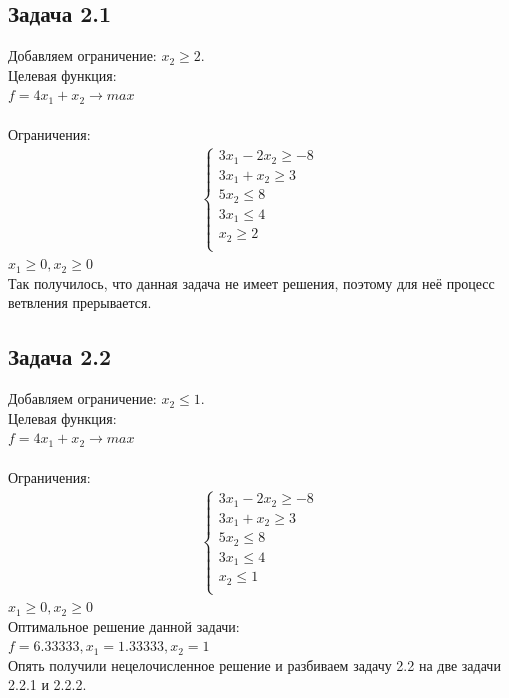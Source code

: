 \documentclass[14pt,a4paper,fleqn]{extarticle}
\begin{document}
	\subsection*{Задача 2.1}
	Добавляем ограничение: $x_2 \geq 2$.\\
	
	Целевая функция:\\
	$f = 4x_1+x_2 \longrightarrow max$\\\\
	Ограничения:
	\begin{align*}
		\begin{cases}
			3x_1 - 2x_2 \geq -8\\
			3x_1 + x_2 \geq 3\\
			5 x_2 \leq 8\\
			3 x_1 \leq 4\\
			x_2 \geq 2\\
		\end{cases}
	\end{align*}
	$x_1 \geq 0, x_2 \geq 0$\\
	
	Так получилось, что данная задача не имеет решения, поэтому для неё процесс ветвления прерывается.\\
	
	\newpage
	\subsection*{Задача 2.2}
	Добавляем ограничение: $x_2 \leq 1$.\\
	
	Целевая функция:\\
	$f = 4x_1+x_2 \longrightarrow max$\\\\
	Ограничения:
	\begin{align*}
		\begin{cases}
			3x_1 - 2x_2 \geq -8\\
			3x_1 + x_2 \geq 3\\
			5 x_2 \leq 8\\
			3 x_1 \leq 4\\
			x_2 \leq 1\\
		\end{cases}
	\end{align*}
	$x_1 \geq 0, x_2 \geq 0$\\
	
	Оптимальное решение данной задачи:\\
	$f = 6.33333, x_1 = 1.33333, x_2 = 1$\\
	Опять получили нецелочисленное решение и разбиваем задачу 2.2 на две задачи 2.2.1 и 2.2.2.
	\newpage
\end{document}
